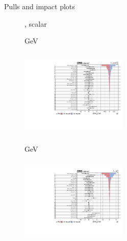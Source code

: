 \documentclass[8pt]{beamer}
\begin{document}
\begin{frame}{Pulls and impact plots}
\justifying
\begin{figure}[htbp]
\centering
\begin{block}{, scalar}\end{block}	\vspace{-8pt}

\begin{minipage}[b]{0.49\textwidth}
\begin{center}
\centering \begin{block}{ GeV}\end{block}	
\includegraphics[width=5.1cm, height=4.2cm]{figs/impacts_2018_both_scalar_100.pdf}
\end{center}
\end{minipage}\hfill
\begin{minipage}[b]{0.49\textwidth}
\begin{center}
\centering \begin{block}{ GeV}\end{block}	
\includegraphics[width=5.1cm, height=4.2cm]{figs/impacts_2018_both_scalar_500.pdf}
\end{center}
\end{minipage} \hfill
\end{figure}
\end{frame}
\end{document}
